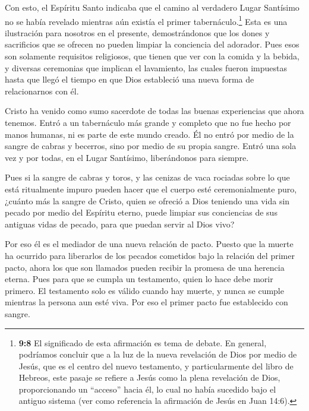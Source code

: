  Con esto, el Espíritu Santo indicaba que el camino al
verdadero Lugar Santísimo no se había revelado mientras aún existía el
primer tabernáculo.\footnote{\textbf{9:8} El significado de esta
  afirmación es tema de debate. En general, podríamos concluir que a la
  luz de la nueva revelación de Dios por medio de Jesús, que es el
  centro del nuevo testamento, y particularmente del libro de Hebreos,
  este pasaje se refiere a Jesús como la plena revelación de Dios,
  proporcionando un ``acceso'' hacia él, lo cual no había sucedido bajo
  el antiguo sistema (ver como referencia la afirmación de Jesús en Juan
  14:6).}  Esta es una ilustración para nosotros en el
presente, demostrándonos que los dones y sacrificios que se ofrecen no
pueden limpiar la conciencia del adorador.  Pues esos son
solamente requisitos religiosos, que tienen que ver con la comida y la
bebida, y diversas ceremonias que implican el lavamiento, las cuales
fueron impuestas hasta que llegó el tiempo en que Dios estableció una
nueva forma de relacionarnos con él.

 Cristo ha venido como sumo sacerdote de todas las buenas
experiencias que ahora tenemos. Entró a un tabernáculo más grande y
completo que no fue hecho por manos humanas, ni es parte de este mundo
creado.  Él no entró por medio de la sangre de cabras y
becerros, sino por medio de su propia sangre. Entró una sola vez y por
todas, en el Lugar Santísimo, liberándonos para siempre.

 Pues si la sangre de cabras y toros, y las cenizas de vaca
rociadas sobre lo que está ritualmente impuro pueden hacer que el cuerpo
esté ceremonialmente puro,  ¿cuánto más la sangre de
Cristo, quien se ofreció a Dios teniendo una vida sin pecado por medio
del Espíritu eterno, puede limpiar sus conciencias de sus antiguas vidas
de pecado, para que puedan servir al Dios vivo?

 Por eso él es el mediador de una nueva relación de pacto.
Puesto que la muerte ha ocurrido para liberarlos de los pecados
cometidos bajo la relación del primer pacto, ahora los que son llamados
pueden recibir la promesa de una herencia eterna.  Pues
para que se cumpla un testamento, quien lo hace debe morir primero.
 El testamento solo es válido cuando hay muerte, y nunca se
cumple mientras la persona aun esté viva.  Por eso el
primer pacto fue establecido con sangre.

